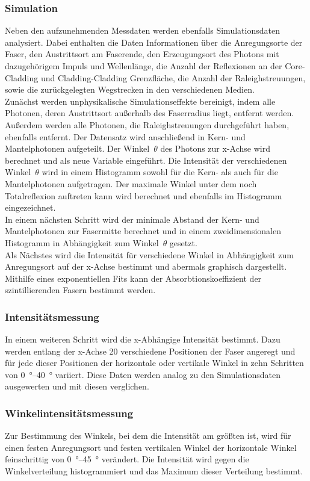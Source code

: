\subsubsection{Simulation}
Neben den aufzunehmenden Messdaten werden ebenfalls Simulationsdaten analysiert. Dabei enthalten die Daten Informationen über die Anregungsorte der Faser, den Austrittsort
am Faserende, den Erzeugungsort des Photons mit dazugehörigem Impuls und Wellenlänge, die Anzahl der Reflexionen an der Core-Cladding und Cladding-Cladding Grenzfläche, die
Anzahl der Raleighstreuungen, sowie die zurückgelegten Wegstrecken in den verschiedenen Medien. \\
Zunächst werden unphysikalische Simulationseffekte bereinigt, indem alle Photonen, deren Austrittsort außerhalb des Faserradius liegt, entfernt werden. Außerdem 
werden alle Photonen, die Raleighstreuungen durchgeführt haben, ebenfalls entfernt. Der Datensatz wird anschließend in Kern- und Mantelphotonen aufgeteilt. Der Winkel~$\theta$
des Photons zur x-Achse wird berechnet und als neue Variable eingeführt. Die Intensität der verschiedenen Winkel~$\theta$ wird in einem Histogramm sowohl für die Kern- als auch 
für die Mantelphotonen aufgetragen. Der maximale Winkel unter dem noch Totalreflexion auftreten kann wird berechnet und ebenfalls im Histogramm eingezeichnet. \\
In einem nächsten Schritt wird der minimale Abstand der Kern- und Mantelphotonen zur Fasermitte berechnet und in einem zweidimensionalen Histogramm in Abhängigkeit zum Winkel~$\theta$
gesetzt. \\
Als Nächstes wird die Intensität für verschiedene Winkel in Abhängigkeit zum Anregungsort auf der x-Achse bestimmt und abermals graphisch dargestellt. Mithilfe eines
exponentiellen Fits kann der Absorbtionskoeffizient der szintillierenden Fasern bestimmt werden.

\subsubsection{Intensitätsmessung}
In einem weiteren Schritt wird die x-Abhängige Intensität bestimmt. Dazu werden entlang der x-Achse 20 verschiedene Positionen der Faser angeregt und für jede dieser
Positionen der horizontale oder vertikale Winkel in zehn Schritten von \qtyrange{0}{40}{\degree} variiert. Diese Daten werden analog zu den Simulationsdaten ausgewerten und 
mit diesen verglichen.

\subsubsection{Winkelintensitätsmessung}
Zur Bestimmung des Winkels, bei dem die Intensität am größten ist, wird für einen festen Anregungsort und festen vertikalen Winkel der horizontale Winkel feinschrittig von
\qtyrange{0}{45}{\degree} verändert. Die Intensität wird gegen die Winkelverteilung histogrammiert und das Maximum dieser Verteilung bestimmt.